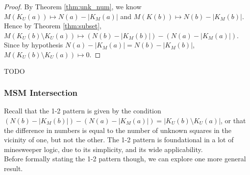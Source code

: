\begin{proof}
    By Theorem \ref{thm:unk_num}, we know $M(K_U(a))\mapsto N(a)-|K_M(a)|$ and $M(K(b))\mapsto N(b)-|K_M(b)|$. Hence by Theorem \ref{thm:subset}, $M(K_U(b)\setminus K_U(a))\mapsto(N(b)-|K_M(b)|)-(N(a)-|K_M(a)|)$. Since by hypothesis $N(a)-|K_M(a)|=N(b)-|K_M(b)|$, $M(K_U(b)\setminus K_U(a))\mapsto0$.
\end{proof}

TODO\\

\subsubsection*{MSM Intersection}

Recall that the 1-2 pattern is given by the condition $(N(b)-|K_M(b)|)-(N(a)-|K_M(a)|)=|K_U(b)\setminus K_U(a)|$, or that the difference in numbers is equal to the number of unknown squares in the vicinity of one, but not the other. The 1-2 pattern is foundational in a lot of minesweeper logic, due to its simplicity, and its wide applicability.\\

Before formally stating the 1-2 pattern though, we can explore one more general result.

